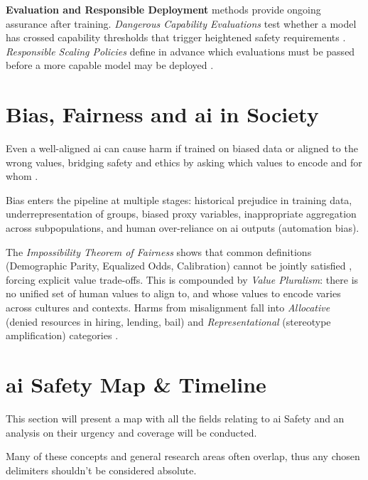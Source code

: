 \begin{toreview}
	\textbf{Evaluation and Responsible Deployment} methods provide ongoing assurance after training. \textit{Dangerous Capability Evaluations} test whether a model has crossed capability thresholds that trigger heightened safety requirements \cite{AISafetyReport2025}. \textit{Responsible Scaling Policies} define in advance which evaluations must be passed before a more capable model may be deployed \cite{FLIAISafetyIndex2025}.

	\section{Bias, Fairness and \gls{ai} in Society}\label{sec:bias-fairness}

	Even a well-aligned \gls{ai} can cause harm if trained on biased data or aligned to the wrong values, bridging safety and ethics by asking which values to encode and for whom \cite{milliere_normative_2025}.

	Bias enters the pipeline at multiple stages: historical prejudice in training data, underrepresentation of groups, biased proxy variables, inappropriate aggregation across subpopulations, and human over-reliance on \gls{ai} outputs (automation bias).

	The \textit{Impossibility Theorem of Fairness} shows that common definitions (Demographic Parity, Equalized Odds, Calibration) cannot be jointly satisfied \cite{kleinberg2016inherent}, forcing explicit value trade-offs. This is compounded by \textit{Value Pluralism}: there is no unified set of human values to align to, and whose values to encode varies across cultures and contexts. Harms from misalignment fall into \textit{Allocative} (denied resources in hiring, lending, bail) and \textit{Representational} (stereotype amplification) categories \cite{RajiDobbe2024}.

\end{toreview}

\section{\gls{ai} Safety Map \& Timeline}\label{ai_safety_map}

This section will present a map with all the fields relating to \gls{ai} Safety and an analysis on their urgency and coverage will be conducted.

Many of these concepts and general research areas often overlap, thus any chosen delimiters shouldn't be considered absolute.

